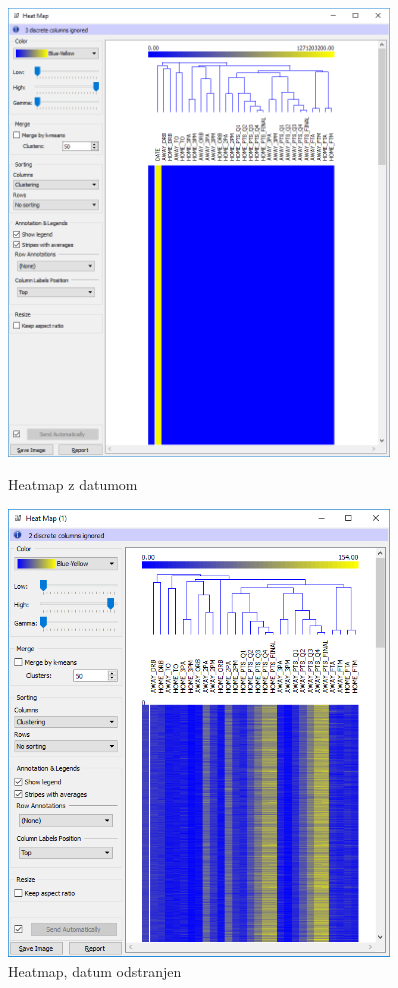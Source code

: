 \documentclass[a4paper,11pt]{article}
\begin{document}
\begin{figure}[H]
    \centering
    \begin{minipage}{0.5\textwidth}
        \centering
        \includegraphics[width=0.9\textwidth]{OC_attrib-cluster.png}
        \caption{Heatmap z datumom}
        \label{slika3.1}
    \end{minipage}\hfill
    \begin{minipage}{0.5\textwidth}
        \centering
        \includegraphics[width=0.9\textwidth]{OC_attrib-cluster-no_date.png}
        \caption{Heatmap, datum odstranjen}
        \label{slika3.2}
    \end{minipage}
\end{figure}
\end{document}
